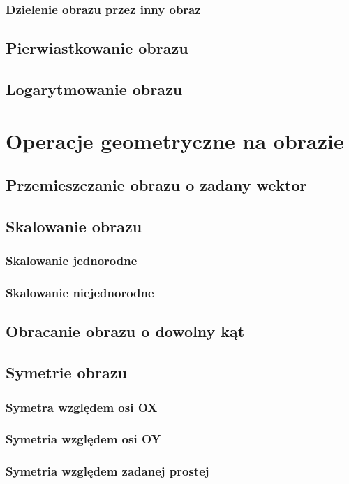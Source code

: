 \documentclass[a4paper,12pt, titlepage]{report}
\begin{document}
\subsection{Dzielenie obrazu przez inny obraz}
\section{Pierwiastkowanie obrazu}
\section{Logarytmowanie obrazu}

\chapter{Operacje geometryczne na obrazie}
\section{Przemieszczanie obrazu o zadany wektor}
\section{Skalowanie obrazu}
\subsection{Skalowanie jednorodne}
\subsection{Skalowanie niejednorodne}
\section{Obracanie obrazu o dowolny kąt}
\section{Symetrie obrazu}
\subsection{Symetra względem osi OX}
\subsection{Symetria względem osi OY}
\subsection{Symetria względem zadanej prostej}
\end{document}
